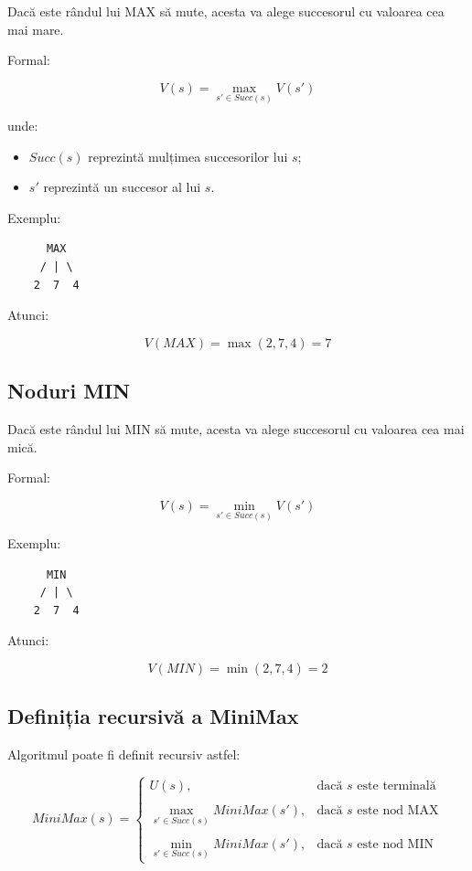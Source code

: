 \documentclass[12pt,a4paper]{article}
\begin{document}
Dacă este rândul lui MAX să mute, acesta va alege succesorul cu valoarea cea mai mare.

Formal:

\[
V(s)=\max_{s' \in Succ(s)} V(s')
\]

unde:

\begin{itemize}
\item $Succ(s)$ reprezintă mulțimea succesorilor lui $s$;
\item $s'$ reprezintă un succesor al lui $s$.
\end{itemize}

Exemplu:

\begin{verbatim}
      MAX
     / | \
    2  7  4
\end{verbatim}

Atunci:

\[
V(MAX)=\max(2,7,4)=7
\]

\subsection{Noduri MIN}

Dacă este rândul lui MIN să mute, acesta va alege succesorul cu valoarea cea mai mică.

Formal:

\[
V(s)=\min_{s' \in Succ(s)} V(s')
\]

Exemplu:

\begin{verbatim}
      MIN
     / | \
    2  7  4
\end{verbatim}

Atunci:

\[
V(MIN)=\min(2,7,4)=2
\]

\subsection{Definiția recursivă a MiniMax}

Algoritmul poate fi definit recursiv astfel:

\[
MiniMax(s)=
\begin{cases}
U(s), & \text{dacă } s \text{ este terminală} \\\\
\max\limits_{s' \in Succ(s)} MiniMax(s'),
& \text{dacă } s \text{ este nod MAX} \\\\
\min\limits_{s' \in Succ(s)} MiniMax(s'),
& \text{dacă } s \text{ este nod MIN}
\end{cases}
\]
\end{document}
